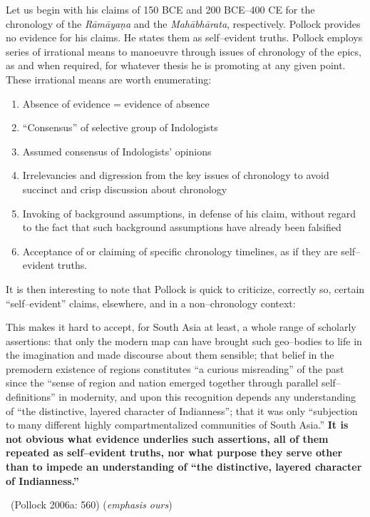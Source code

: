 Let us begin with his claims of 150 BCE and 200 BCE–400 CE for the chronology of the \textit{Rāmāyaṇa} and the \textit{Mahābhārata}, respectively. Pollock provides no evidence for his claims. He states them as self–evident truths. Pollock employs series of irrational means to manoeuvre through issues of chronology of the epics, as and when required, for whatever thesis he is promoting at any given point. These irrational means are worth enumerating:

\begin{enumerate}
\item Absence of evidence = evidence of absence

 \item “Consensus” of selective group of Indologists

 \item Assumed consensus of Indologists’ opinions

 \item Irrelevancies and digression from the key issues of chronology to avoid succinct and crisp discussion about chronology

 \item Invoking of background assumptions, in defense of his claim, without regard to the fact that such background assumptions have already been falsified

 \item Acceptance of or claiming of specific chronology timelines, as if they are self–evident truths.

\end{enumerate}

It is then interesting to note that Pollock is quick to criticize, correctly so, certain “self–evident” claims, elsewhere, and in a non–chronology context:

\begin{myquote}
This makes it hard to accept, for South Asia at least, a whole range of scholarly assertions: that only the modern map can have brought such geo–bodies to life in the imagination and made discourse about them sensible; that belief in the premodern existence of regions constitutes “a curious misreading” of the past since the “sense of region and nation emerged together through parallel self–deﬁnitions” in modernity, and upon this recognition depends any understanding of “the distinctive, layered character of Indianness”; that it was only “subjection to many different highly compartmentalized communities of South Asia.” \textbf{It is not obvious what evidence underlies such assertions, all of them repeated as self–evident truths, nor what purpose they serve other than to impede an understanding of “the distinctive, layered character of Indianness.”} 

~\hfill (Pollock 2006a: 560) (\textit{emphasis ours})
\end{myquote}

